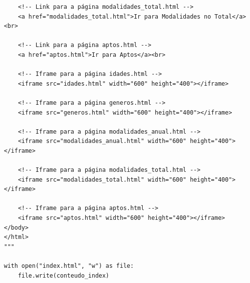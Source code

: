 \documentclass[11pt,a4paper]{report}%
\begin{document}
\begin{verbatim}
    <!-- Link para a página modalidades_total.html -->
    <a href="modalidades_total.html">Ir para Modalidades no Total</a><br>

    <!-- Link para a página aptos.html -->
    <a href="aptos.html">Ir para Aptos</a><br>

    <!-- Iframe para a página idades.html -->
    <iframe src="idades.html" width="600" height="400"></iframe>

    <!-- Iframe para a página generos.html -->
    <iframe src="generos.html" width="600" height="400"></iframe>

    <!-- Iframe para a página modalidades_anual.html -->
    <iframe src="modalidades_anual.html" width="600" height="400"></iframe>

    <!-- Iframe para a página modalidades_total.html -->
    <iframe src="modalidades_total.html" width="600" height="400"></iframe>

    <!-- Iframe para a página aptos.html -->
    <iframe src="aptos.html" width="600" height="400"></iframe>
</body>
</html>
"""

with open("index.html", "w") as file:
    file.write(conteudo_index)

\end{verbatim}
\end{document}

